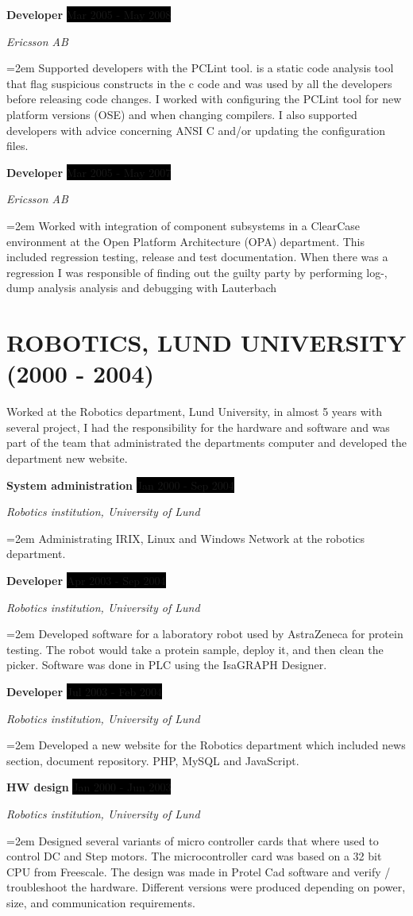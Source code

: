 \documentclass[paper=a4,fontsize=11pt]{scrartcl}
\newcommand{\sepspace}{\vspace*{1em}}
\newcommand{\NewPart}[1]{\section*{\uppercase{#1}}}
\newcommand{\EducationEntry}[4]{
		\noindent \textbf{#1} \hfill 					%
		\colorbox{Black}{%
			\parbox{6em}{%
			\hfill\color{White}#2}} \par				%
		\noindent \textit{#3} \par					%
		\noindent\hangindent=2em\hangafter=0 \small #4 	%
		\normalsize \par}
\newcommand{\WorkEntry}[4]{						%
		\noindent \textbf{#1} \hfill 					%
		\colorbox{Black}{\color{White}#2} \par		%
		\noindent \textit{#3} \par					%
		\noindent\hangindent=2em\hangafter=0 \small #4 	%
		\normalsize \par}
\begin{document}
\WorkEntry{Developer}{Mar 2005 - May 2008}{Ericsson AB}	
  {Supported developers with the PCLint tool. is a static code analysis tool that flag suspicious 
    constructs in the c code and was used by all the developers before releasing code changes. 
  I worked with configuring the PCLint tool for new platform versions (OSE) and when changing 
  compilers. I also supported developers with advice concerning ANSI C and/or updating the 
  configuration files. 
  }
\sepspace

\WorkEntry{Developer}{Mar 2005 - May 2007}{Ericsson AB}		
  {Worked with integration of component subsystems in a ClearCase environment at the Open Platform 
  Architecture (OPA) department. This included regression testing, release and test documentation. 
  When there was a regression I was responsible of finding out the guilty party by performing log-, 
  dump analysis analysis and debugging with Lauterbach}
\sepspace

\NewPart{Robotics, Lund University (2000 - 2004)}{Worked at the Robotics department, Lund University,
  in almost 5 years with several project, I had the responsibility for the hardware and software 
  and was part of the team that administrated the departments computer and developed the department new website.}
\sepspace

\WorkEntry{System administration}{Jan 2000 - Sep 2004}{Robotics institution, University of Lund}		
  {Administrating IRIX, Linux and Windows Network at the robotics department.}
\sepspace

\WorkEntry{Developer}{Apr 2003 - Sep 2004}{Robotics institution, University of Lund}		
  {Developed software for a laboratory robot used by AstraZeneca for protein testing. 
  The robot would take a protein sample, deploy it, and then clean the picker. 
  Software was done in PLC using the IsaGRAPH Designer.}
\sepspace

\WorkEntry{Developer}{Jul 2003 - Feb 2004}{Robotics institution, University of Lund}		
  {Developed a new website for the Robotics department which included news section, document repository. 
  PHP, MySQL and JavaScript.} 
\sepspace

\WorkEntry{HW design}{Jan 2000 - Jun 2003}{Robotics institution, University of Lund}		
{Designed several variants of micro controller cards that where used to control DC and Step motors. The microcontroller card was based on a 32 bit CPU from 
  Freescale. The design was made in Protel Cad software and verify / troubleshoot the hardware. Different versions were produced depending on power, size, and communication requirements.
}
\sepspace
\end{document}
